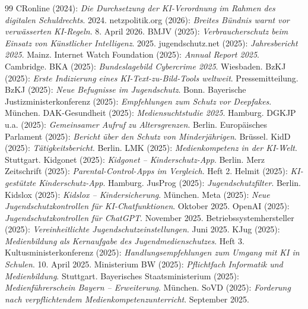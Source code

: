 \documentclass[12pt,a4paper]{article}
\begin{document}
\begin{thebibliography}{99}
		 CRonline (2024): \emph{Die Durchsetzung der KI-Verordnung im Rahmen des digitalen Schuldrechts}. 2024.
		 netzpolitik.org (2026): \emph{Breites Bündnis warnt vor verwässerten KI-Regeln}. 8. April 2026.
		 BMJV (2025): \emph{Verbraucherschutz beim Einsatz von Künstlicher Intelligenz}. 2025.
		 jugendschutz.net (2025): \emph{Jahresbericht 2025}. Mainz.
		 Internet Watch Foundation (2025): \emph{Annual Report 2025}. Cambridge.
		 BKA (2025): \emph{Bundeslagebild Cybercrime 2025}. Wiesbaden.
		 BzKJ (2025): \emph{Erste Indizierung eines KI-Text-zu-Bild-Tools weltweit}. Pressemitteilung.
		 BzKJ (2025): \emph{Neue Befugnisse im Jugendschutz}. Bonn.
		 Bayerische Justizministerkonferenz (2025): \emph{Empfehlungen zum Schutz vor Deepfakes}. München.
		 DAK-Gesundheit (2025): \emph{Mediensuchtstudie 2025}. Hamburg.
		 DGKJP u.a. (2025): \emph{Gemeinsamer Aufruf zu Altersgrenzen}. Berlin.
		 Europäisches Parlament (2025): \emph{Bericht über den Schutz von Minderjährigen}. Brüssel.
		 KidD (2025): \emph{Tätigkeitsbericht}. Berlin.
		 LMK (2025): \emph{Medienkompetenz in der KI-Welt}. Stuttgart.
		 Kidgonet (2025): \emph{Kidgonet – Kinderschutz-App}. Berlin.
		 Merz Zeitschrift (2025): \emph{Parental-Control-Apps im Vergleich}. Heft 2.
		 Helmit (2025): \emph{KI-gestützte Kinderschutz-App}. Hamburg.
		 JusProg (2025): \emph{Jugendschutzfilter}. Berlin.
		 Kidslox (2025): \emph{Kidslox – Kindersicherung}. München.
		 Meta (2025): \emph{Neue Jugendschutzkontrollen für KI-Chatfunktionen}. Oktober 2025.
		 OpenAI (2025): \emph{Jugendschutzkontrollen für ChatGPT}. November 2025.
		 Betriebssystemhersteller (2025): \emph{Vereinheitlichte Jugendschutzeinstellungen}. Juni 2025.
		 KJug (2025): \emph{Medienbildung als Kernaufgabe des Jugendmedienschutzes}. Heft 3.
		 Kultusministerkonferenz (2025): \emph{Handlungsempfehlungen zum Umgang mit KI in Schulen}. 10. April 2025.
		 Ministerium BW (2025): \emph{Pflichtfach Informatik und Medienbildung}. Stuttgart.
		 Bayerisches Staatsministerium (2025): \emph{Medienführerschein Bayern – Erweiterung}. München.
		 SoVD (2025): \emph{Forderung nach verpflichtendem Medienkompetenzunterricht}. September 2025.

\end{thebibliography}
\end{document}
